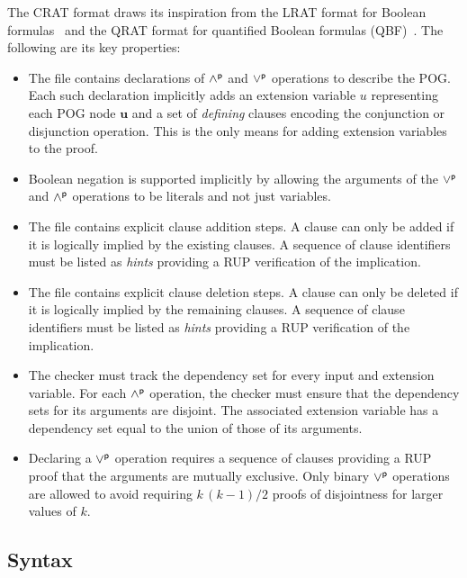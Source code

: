 \documentclass[letterpaper,USenglish,cleveref, autoref, thm-restate]{lipics-v2021}
\newcommand{\pand}{\mathbin{\land^{\sf p}}}
\newcommand{\por}{\mathbin{\lor^{\sf p}}}
\newcommand{\makenode}[1]{\mathbf{#1}}
\newcommand{\nodeu}{\makenode{u}}
\begin{document}
The CRAT format draws its inspiration from the LRAT format for Boolean
formulas~\cite{lrat} and the QRAT format for quantified Boolean
formulas (QBF)~\cite{heule:JAR2014}.  The following are its key properties:
\begin{itemize}
  \item
  The file contains declarations of $\pand$ and $\por$ operations to describe the POG.
  Each such declaration implicitly adds an extension variable $u$ representing each  POG node $\nodeu$ and a set of {\em defining} clauses
  encoding the conjunction or disjunction operation.
  This is the only means for adding extension variables to the proof.
\item Boolean negation is supported implicitly by allowing the
  arguments of the $\por$ and $\pand$ operations to be literals and not just
  variables.
\item
  The file contains explicit clause addition steps.
  A clause can only be added if it is logically implied by the existing clauses.
  A sequence of clause identifiers must be listed as {\em hints} providing a RUP verification of the implication.
\item
  The file contains explicit clause deletion steps.
  A clause can only be deleted if it is logically implied by the remaining clauses.
  A sequence of clause identifiers must be listed as {\em hints} providing a RUP verification of the implication.
\item The checker must track the dependency set for every input and
  extension variable.  For each $\pand$ operation, the checker must ensure that the dependency sets for its arguments are disjoint.
  The associated extension variable has a dependency set equal to the union of those of its arguments.
\item Declaring a $\por$ operation requires a sequence of clauses
  providing a RUP proof that the arguments are mutually exclusive.
  Only binary $\por$ operations are allowed to avoid requiring
  $k\,(k-1)/2$ proofs of disjointness for larger values of $k$.
\end{itemize}

\subsection{Syntax}
\end{document}
